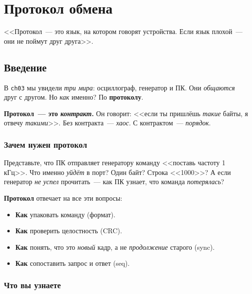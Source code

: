 
\chapter{Протокол обмена}
\label{ch:protocol}

\epigraph{<<Протокол~--- это язык, на котором говорят устройства.
Если язык плохой~--- они не поймут друг друга>>.}{}

\section{Введение}
\label{sec:protocol-intro}

В \texttt{ch03} мы увидели \emph{три мира}: осциллограф,
генератор и ПК. Они \emph{общаются} друг с другом. Но
\emph{как} именно? По \textbf{протоколу}.

\begin{ideabox}
\textbf{Протокол~--- это \emph{контракт}.} Он говорит:
<<если ты пришлёшь \emph{такие} байты, я отвечу \emph{такими}>>.
Без контракта~--- \emph{хаос}. С контрактом~--- \emph{порядок}.
\end{ideabox}

\subsection{Зачем нужен протокол}

Представьте, что ПК отправляет генератору команду
<<поставь частоту 1 кГц>>. Что именно \emph{уйдёт} в порт?
Один байт? Строка <<1000>>? А если генератор \emph{не
успел} прочитать~--- как ПК узнает, что команда \emph{потерялась}?

\textbf{Протокол} отвечает на все эти вопросы:
\begin{itemize}
    \item \textbf{Как} упаковать команду (формат).
    \item \textbf{Как} проверить целостность (CRC).
    \item \textbf{Как} понять, что это \emph{новый} кадр, а не
          \emph{продолжение} старого (sync).
    \item \textbf{Как} сопоставить запрос и ответ (seq).
\end{itemize}

\subsection{Что вы узнаете}

